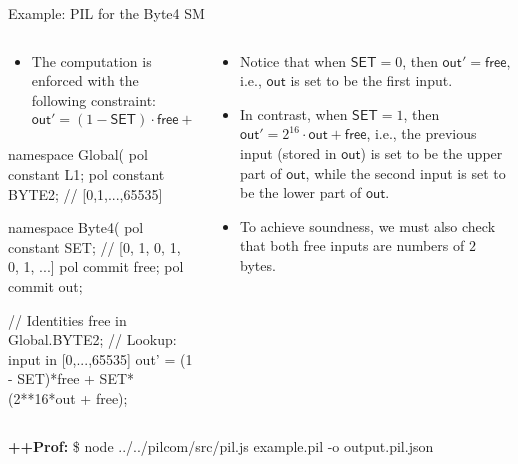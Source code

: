 







\begin{frame}[fragile]{Example: PIL for the Byte4 SM}
\begin{columns}
\begin{column}{0.5\textwidth}
\begin{itemize}
\item The computation is enforced with the following constraint:
\[
\textsf{out}' = (1 - \textsf{SET}) \cdot \textsf{free} + \textsf{SET} \cdot (2^{16} \cdot \textsf{out} + \textsf{free}).
\]
\end{itemize}
\begin{pil}
namespace Global(%
    pol constant L1;
    pol constant BYTE2; // [0,1,...,65535]

namespace Byte4(%
  pol constant SET; // [0, 1, 0, 1, 0, 1, ...]
  pol commit free;
  pol commit out;

  // Identities 
  free in Global.BYTE2; // Lookup: input in [0,...,65535]
  out' = (1 - SET)*free + SET*(2**16*out + free);
\end{pil}
\end{column}
\begin{column}{0.5\textwidth}
\begin{itemize}
\item Notice that when $\textsf{SET} = 0$, then $\textsf{out}' = \textsf{free}$, i.e., $\textsf{out}$ is set to be the first input. 
\item In contrast, when $\textsf{SET} = 1$, then $\textsf{out}' = 2^{16} \cdot \textsf{out} + \textsf{free}$, i.e., the previous input (stored in $\textsf{out}$) is set to be the upper part of $\textsf{out}$, while the second input is set to be the lower part of $\textsf{out}$. 
\item To achieve soundness, we must also check that both free inputs are numbers of $2$ bytes.
\end{itemize}
\end{column}
\end{columns}

\ifPROF
\vspace{0.2cm}
\scriptsize
\textbf{++Prof:}
\$ node ../../pilcom/src/pil.js example.pil -o output.pil.json
\normalsize
\fi
\end{frame}
\fi




